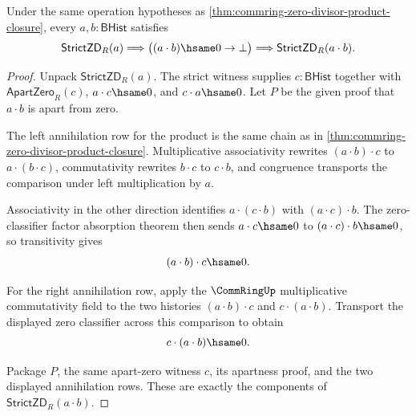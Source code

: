 \begin{theorem}
\label{thm:commring-strict-zero-divisor-product-closure}
Under the same operation hypotheses as
\autoref{thm:commring-zero-divisor-product-closure}, every
$a,b:\mathsf{BHist}$ satisfies
$$
\mathsf{StrictZD}_R(a)
\Longrightarrow
\bigl((a\cdot b)\hsame0\to\bot\bigr)
\Longrightarrow
\mathsf{StrictZD}_R(a\cdot b).
$$
\end{theorem}
\begin{proof}
Unpack $\mathsf{StrictZD}_R(a)$. The strict witness supplies
$c:\mathsf{BHist}$ together with $\mathsf{ApartZero}_R(c)$,
$a\cdot c\hsame0$, and $c\cdot a\hsame0$. Let $P$ be the given proof that
$a\cdot b$ is apart from zero.

The left annihilation row for the product is the same chain as in
\autoref{thm:commring-zero-divisor-product-closure}. Multiplicative
associativity rewrites $(a\cdot b)\cdot c$ to $a\cdot(b\cdot c)$,
commutativity rewrites $b\cdot c$ to $c\cdot b$, and congruence transports the
comparison under left multiplication by $a$.

Associativity in the other direction identifies $a\cdot(c\cdot b)$ with
$(a\cdot c)\cdot b$. The zero-classifier factor absorption theorem then sends
$a\cdot c\hsame0$ to $(a\cdot c)\cdot b\hsame0$, so transitivity gives
$$
(a\cdot b)\cdot c\hsame0.
$$

For the right annihilation row, apply the $\CommRingUp$ multiplicative
commutativity field to the two histories $(a\cdot b)\cdot c$ and
$c\cdot(a\cdot b)$. Transport the displayed zero classifier across this
comparison to obtain
$$
c\cdot(a\cdot b)\hsame0.
$$

Package $P$, the same apart-zero witness $c$, its apartness proof, and the two
displayed annihilation rows. These are exactly the components of
$\mathsf{StrictZD}_R(a\cdot b)$.
\end{proof}

